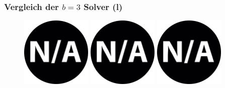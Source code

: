 \documentclass{beamer}
\begin{document}
\begin{frame}
\frametitle{Vergleich der $b = 3$ Solver (l)}

\begin{figure}
\centering
\includegraphics[width=0.3\textwidth]{images/na.png}
\includegraphics[width=0.3\textwidth]{images/na.png}
\includegraphics[width=0.3\textwidth]{images/na.png}
\caption*{\textsc{Zeitlimit 30min} $\quad\quad\quad$ \textsc{Zeitlimit 45min} $\quad\quad\quad$ \textsc{Zeitlimit 60min}}
\begin{subfigure}[b]{0.3\textwidth}
\centering
{}
\end{subfigure}

\end{figure}
\end{frame}
\end{document}
